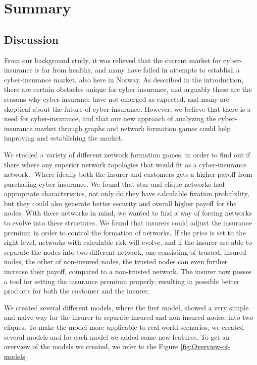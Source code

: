 \chapter{Summary}
\section{Discussion}
From our background study, it was relieved that the current market for cyber-insurance is far from healthy, and many have failed in attempts to establish a cyber-insurance market, also here in Norway. As described in the introduction, there are certain obstacles unique for cyber-insurance, and arguably these are the reasons why cyber-insurance have not emerged as expected, and many are skeptical about the future of cyber-insurance.  However, we believe that there is a need for cyber-insurance, and that our new approach of analyzing the cyber-insurance market through graphs and network formation games could help improving and establishing the market.   

We studied a variety of different network formation games, in order to find out if there where any superior network topologies that would fit as a cyber-insurance network. -Where ideally both the insurer and customers gets a higher payoff from purchasing cyber-insurance. We found that star and clique networks had appropriate characteristics, not only do they have calculable fixation probability, but they could also generate better security and overall higher payoff for the nodes. With these networks in mind, we wanted to find a way of forcing networks to evolve into these structures.  We found that insurers could adjust the insurance premium in order to control the formation of networks. If the price is set to the right level, networks with calculable risk will evolve, and if the insurer are able to separate the nodes into two different network, one consisting of trusted, insured nodes, the other of non-insured nodes, the trusted nodes can even further increase their payoff, compared to a non-trusted network. The insurer now posses a tool for setting the insurance premium properly, resulting in possible better products for both the customer and the insurer.

We created several different models, where the first model, showed a very simple and naive way for the insurer to separate insured and non-insured nodes, into two cliques. To make the model more applicable to real world scenarios, we created several models and for each model we added some new features. To get an overview of the models we created, we refer to the Figure \ref{fig:Overview-of-models}. 

